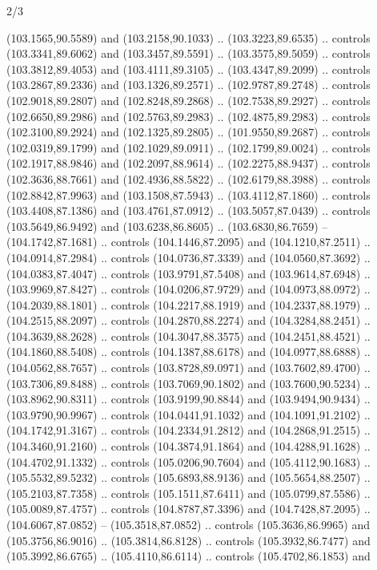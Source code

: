 \begin{flagdescription}{2/3}
\begin{scope}[shift={(0.5\flaglength,0.5)},scale=\flagwidth/320]
\begin{scope}[y=0.8pt, x=0.8pt, yscale=-1,shift={(-118.3,-146)}]
  (103.1565,90.5589) and (103.2158,90.1033) .. (103.3223,89.6535) .. controls
  (103.3341,89.6062) and (103.3457,89.5591) .. (103.3575,89.5059) .. controls
  (103.3812,89.4053) and (103.4111,89.3105) .. (103.4347,89.2099) .. controls
  (103.2867,89.2336) and (103.1326,89.2571) .. (102.9787,89.2748) .. controls
  (102.9018,89.2807) and (102.8248,89.2868) .. (102.7538,89.2927) .. controls
  (102.6650,89.2986) and (102.5763,89.2983) .. (102.4875,89.2983) .. controls
  (102.3100,89.2924) and (102.1325,89.2805) .. (101.9550,89.2687) .. controls
  (102.0319,89.1799) and (102.1029,89.0911) .. (102.1799,89.0024) .. controls
  (102.1917,88.9846) and (102.2097,88.9614) .. (102.2275,88.9437) .. controls
  (102.3636,88.7661) and (102.4936,88.5822) .. (102.6179,88.3988) .. controls
  (102.8842,87.9963) and (103.1508,87.5943) .. (103.4112,87.1860) .. controls
  (103.4408,87.1386) and (103.4761,87.0912) .. (103.5057,87.0439) .. controls
  (103.5649,86.9492) and (103.6238,86.8605) .. (103.6830,86.7659) --
  (104.1742,87.1681) .. controls (104.1446,87.2095) and (104.1210,87.2511) ..
  (104.0914,87.2984) .. controls (104.0736,87.3339) and (104.0560,87.3692) ..
  (104.0383,87.4047) .. controls (103.9791,87.5408) and (103.9614,87.6948) ..
  (103.9969,87.8427) .. controls (104.0206,87.9729) and (104.0973,88.0972) ..
  (104.2039,88.1801) .. controls (104.2217,88.1919) and (104.2337,88.1979) ..
  (104.2515,88.2097) .. controls (104.2870,88.2274) and (104.3284,88.2451) ..
  (104.3639,88.2628) .. controls (104.3047,88.3575) and (104.2451,88.4521) ..
  (104.1860,88.5408) .. controls (104.1387,88.6178) and (104.0977,88.6888) ..
  (104.0562,88.7657) .. controls (103.8728,89.0971) and (103.7602,89.4700) ..
  (103.7306,89.8488) .. controls (103.7069,90.1802) and (103.7600,90.5234) ..
  (103.8962,90.8311) .. controls (103.9199,90.8844) and (103.9494,90.9434) ..
  (103.9790,90.9967) .. controls (104.0441,91.1032) and (104.1091,91.2102) ..
  (104.1742,91.3167) .. controls (104.2334,91.2812) and (104.2868,91.2515) ..
  (104.3460,91.2160) .. controls (104.3874,91.1864) and (104.4288,91.1628) ..
  (104.4702,91.1332) .. controls (105.0206,90.7604) and (105.4112,90.1683) ..
  (105.5532,89.5232) .. controls (105.6893,88.9136) and (105.5654,88.2507) ..
  (105.2103,87.7358) .. controls (105.1511,87.6411) and (105.0799,87.5586) ..
  (105.0089,87.4757) .. controls (104.8787,87.3396) and (104.7428,87.2095) ..
  (104.6067,87.0852) -- (105.3518,87.0852) .. controls (105.3636,86.9965) and
  (105.3756,86.9016) .. (105.3814,86.8128) .. controls (105.3932,86.7477) and
  (105.3992,86.6765) .. (105.4110,86.6114) .. controls (105.4702,86.1853) and

\end{scope}
\end{scope}
\end{flagdescription}
